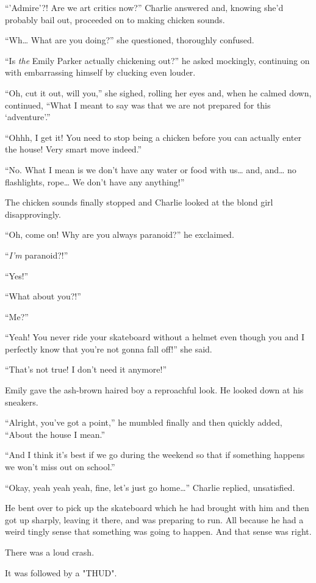 “'Admire'?! Are we art critics now?” Charlie answered and, knowing she'd probably bail out, proceeded on to making chicken sounds.

“Wh… What are you doing?” she questioned, thoroughly confused.

“Is \textit{the} Emily Parker actually chickening out?” he asked mockingly, continuing on with embarrassing himself by clucking even louder.

“Oh, cut it out, will you,” she sighed, rolling her eyes and, when he calmed down, continued, “What I meant to say was that we are not prepared for this ‘adventure'.”

“Ohhh, I get it! You need to stop being a chicken before you can actually enter the house! Very smart move indeed.”

“No. What I mean is we don't have any water or food with us… and, and… no flashlights, rope… We don't have any anything!”

The chicken sounds finally stopped and Charlie looked at the blond girl disapprovingly.

“Oh, come on! Why are you always paranoid?” he exclaimed.

“\textit{I'm} paranoid?!”

“Yes!”

“What about you?!”

“Me?”

“Yeah! You never ride your skateboard without a helmet even though you and I perfectly know that you're not gonna fall off!” she said.

“That's not true! I don't need it anymore!”

Emily gave the ash-brown haired boy a reproachful look. He looked down at his sneakers.

“Alright, you've got a point,” he mumbled finally and then quickly added, “About the house I mean.”

“And I think it's best if we go during the weekend so that if something happens we won't miss out on school.”

“Okay, yeah yeah yeah, fine, let's just go home…” Charlie replied, unsatisfied.

He bent over to pick up the skateboard which he had brought with him and then got up sharply, leaving it there, and was preparing to run. All because he had a weird tingly sense that something was going to happen. And that sense was right.

There was a loud crash.

It was followed by a "THUD".

